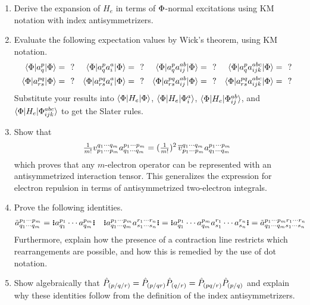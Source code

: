 \documentclass[11pt]{article}
\numberwithin{equation}{section}
\begin{document}
\begin{enumerate}
\item
  Derive the expansion of $H_e$ in terms of $\Phi $-normal excitations using KM notation with index antisymmetrizers.

\item
  Evaluate the following expectation values by Wick's theorem, using KM notation.
\begin{align*}
  \langle\Phi |a^p_q|\Phi \rangle
=&\
  \,\,?
&
  \langle\Phi |a^p_qa^a_i|\Phi \rangle
=&\
  \,\,?
&
  \langle\Phi |a^p_qa^{ab}_{ij}|\Phi \rangle
=&\
  \,\,?
&
  \langle\Phi |a^p_qa^{abc}_{ijk}|\Phi \rangle
=&\
  \,\,?
\\
  \langle\Phi |a^{pq}_{rs}|\Phi \rangle
=&\
  \,\,?
&
  \langle\Phi |a^{pq}_{rs}a^a_i|\Phi \rangle
=&\
  \,\,?
&
  \langle\Phi |a^{pq}_{rs}a^{ab}_{ij}|\Phi \rangle
=&\
  \,\,?
&
  \langle\Phi |a^{pq}_{rs}a^{abc}_{ijk}|\Phi \rangle
=&\
  \,\,?
\end{align*}
  Substitute your results into $\langle\Phi |H_e|\Phi \rangle$, $\langle\Phi |H_e|\Phi _i^a\rangle$, $\langle\Phi |H_e|\Phi _{ij}^{ab}\rangle$, and $\langle\Phi |H_e|\Phi _{ijk}^{abc}\rangle$ to get the Slater rules.

\item
  Show that
\begin{align*}
  \tfrac{1}{m!}
  v_{p_1\cdots p_m}^{q_1\cdots q_m}
  a^{p_1\cdots p_m}_{q_1\cdots q_m}
=
  (\tfrac{1}{m!})^2\,
  \overline{v}_{p_1\cdots p_m}^{q_1\cdots q_m}
  a^{p_1\cdots p_m}_{q_1\cdots q_m}
\end{align*}
  which proves that any $m$-electron operator can be represented with an antisymmetrized interaction tensor.
  This generalizes the expression for electron repulsion in terms of antisymmetrized two-electron integrals.

\item
  Prove the following identities.
\begin{align*}
  \tl{a}^{p_1\cd p_m}_{q_1\cd q_m}
=
  \gno{a^{p_1}_{q_1}\cd a^{p_m}_{q_m}}
&&
  \gno{a^{p_1\cd p_m}_{q_1\cd q_m}a^{r_1\cd r_n}_{s_1\cd s_n}}
=
  \gno{a^{p_1}_{q_1}\cd a^{p_m}_{q_m}a^{r_1}_{s_1}\cd a^{r_n}_{s_n}}
=
  \tl{a}^{p_1\cd p_mr_1\cd r_n}_{q_1\cd q_ms_1\cd s_n}
\end{align*}
  Furthermore, explain how the presence of a contraction line restricts which rearrangements are possible, and how this is remedied by the use of dot notation.

\item
  Show algebraically that $\hat{P}_{(p/q/r)}=\hat{P}_{(p/qr)}\hat{P}_{(q/r)}=\hat{P}_{(pq/r)}\hat{P}_{(p/q)}$ and explain why these identities follow from the definition of the index antisymmetrizers.


\end{enumerate}
\end{document}
